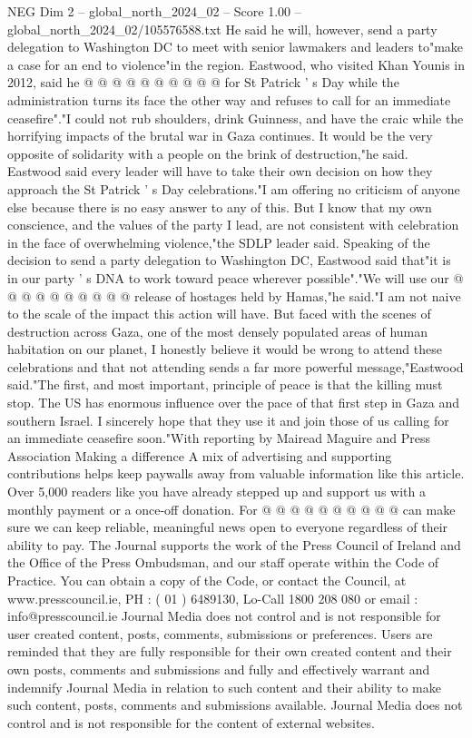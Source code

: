 \begin{textsample}{NEG Dim 2 – global\_north\_2024\_02 – Score 1.00 – global\_north\_2024\_02/105576588.txt}
He said he will, however, send a party delegation to Washington DC to meet with senior lawmakers and leaders to"make a case for an end to violence"in the region.
Eastwood, who visited Khan Younis in 2012, said he @ @ @ @ @ @ @ @ @ @ for St Patrick ' s Day while the administration turns its face the other way and refuses to call for an immediate ceasefire"."I could not rub shoulders, drink Guinness, and have the craic while the horrifying impacts of the brutal war in Gaza continues.
It would be the very opposite of solidarity with a people on the brink of destruction,"he said.
Eastwood said every leader will have to take their own decision on how they approach the St Patrick ' s Day celebrations."I am offering no criticism of anyone else because there is no easy answer to any of this.
But I know that my own conscience, and the values of the party I lead, are not consistent with celebration in the face of overwhelming violence,"the SDLP leader said.
Speaking of the decision to send a party delegation to Washington DC, Eastwood said that"it is in our party ' s DNA to work toward peace wherever possible"."We will use our @ @ @ @ @ @ @ @ @ @ release of hostages held by Hamas,"he said."I am not naive to the scale of the impact this action will have.
But faced with the scenes of destruction across Gaza, one of the most densely populated areas of human habitation on our planet, I honestly believe it would be wrong to attend these celebrations and that not attending sends a far more powerful message,"Eastwood said."The first, and most important, principle of peace is that the killing must stop.
The US has enormous influence over the pace of that first step in Gaza and southern Israel.
I sincerely hope that they use it and join those of us calling for an immediate ceasefire soon."With reporting by Mairead Maguire and Press Association Making a difference A mix of advertising and supporting contributions helps keep paywalls away from valuable information like this article.
Over 5,000 readers like you have already stepped up and support us with a monthly payment or a once-off donation.
For @ @ @ @ @ @ @ @ @ @ can make sure we can keep reliable, meaningful news open to everyone regardless of their ability to pay.
The Journal supports the work of the Press Council of Ireland and the Office of the Press Ombudsman, and our staff operate within the Code of Practice.
You can obtain a copy of the Code, or contact the Council, at www.presscouncil.ie, PH : ( 01 ) 6489130, Lo-Call 1800 208 080 or email : info@presscouncil.ie Journal Media does not control and is not responsible for user created content, posts, comments, submissions or preferences.
Users are reminded that they are fully responsible for their own created content and their own posts, comments and submissions and fully and effectively warrant and indemnify Journal Media in relation to such content and their ability to make such content, posts, comments and submissions available.
Journal Media does not control and is not responsible for the content of external websites.

\end{textsample}
